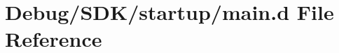 \hypertarget{_debug_2_s_d_k_2startup_2main_8d}{}\section{Debug/\+S\+D\+K/startup/main.d File Reference}
\label{_debug_2_s_d_k_2startup_2main_8d}
